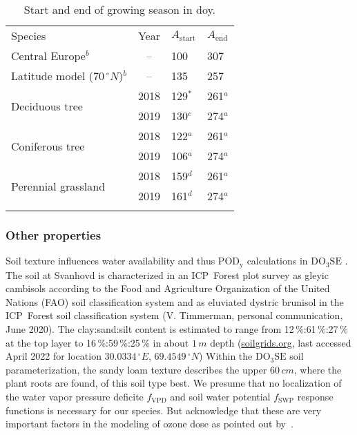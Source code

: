 \documentclass[bg, manuscript]{copernicus}
\begin{document}
\begin{table}[t]
  \caption{Start and end of growing season in \unit{doy}.}
  \label{tab:sensitivity_tests_gs}
  \begin{tabular}{lcll}
    \tophline
    Species & Year & $A_\mathrm{start}$ & $A_\mathrm{end}$\\
    \middlehline
    Central Europe$^b$ & -- & 100 & 307\\
    Latitude model ($70\,\unit{^\circ N}$)$^b$ & -- & 135 & 257\\
    \multirow{2}{*}{Deciduous tree} & 2018 & 129$^*$ & 261$^a$ \\
    & 2019 & 130$^c$ & 274$^a$ \\
    \multirow{2}{*}{Coniferous tree} & 2018 & 122$^a$ & 261$^a$ \\
    & 2019 & 106$^a$ & 274$^a$ \\
    \multirow{2}{*}{Perennial grassland} & 2018 & 159$^d$ & 261$^a$\\
    & 2019 & 161$^d$ & 274$^a$ \\
    \bottomhline
  \end{tabular}
\end{table}

\subsubsection{Other properties}
\label{subsec:soil}

Soil texture influences water availability and thus $\mathrm{POD_y}$ calculations in $\mathrm{DO_3SE}$ \citep{ACP:Bueker2012}. The soil at Svanhovd is characterized in an ICP~Forest plot survey as gleyic cambisols according to the Food and Agriculture Organization of the United Nations (FAO) soil classification system and as eluviated dystric brunisol in the ICP~Forest soil classification system (V. Timmerman, personal communication, June 2020). The clay:sand:silt content is estimated to range from 12\,\%:61\,\%:27\,\% at the top layer to 16\,\%:59\,\%:25\,\% in about $1\,\unit{m}$ depth (\href{https://soilgrids.org/}{soilgrids.org}, last accessed April 2022 for location $30.0334\,\unit{^\circ E}$, $69.4549\,\unit{^\circ N}$) Within the $\mathrm{DO_3SE}$ soil parameterization, the sandy loam texture describes the upper $60\,\unit{cm}$, where the plant roots are found, of this soil type best. We presume that no localization of the water vapor pressure deficite $f_\mathrm{VPD}$ and soil water potential $f_\mathrm{SWP}$ response functions is necessary for our species. But acknowledge that these are very important factors in the modeling of ozone dose as pointed out by~\citet{ACP:Bueker2012}.
\end{document}
